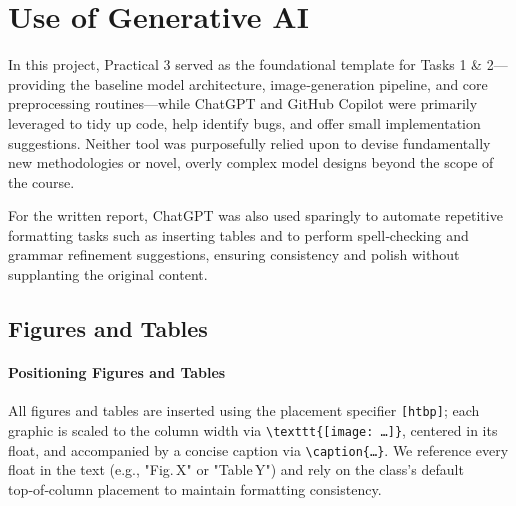 \documentclass[conference]{IEEEtran}
\begin{document}
\section{Use of Generative AI}

In this project, Practical 3 served as the foundational template for Tasks 1 \& 2—providing the baseline model architecture, image‐generation pipeline, and core preprocessing routines—while ChatGPT and GitHub Copilot were primarily leveraged to tidy up code, help identify bugs, and offer small implementation suggestions. Neither tool was purposefully relied upon to devise fundamentally new methodologies or novel, overly complex model designs beyond the scope of the course. 

For the written report, ChatGPT was also used sparingly to automate repetitive formatting tasks such as inserting tables and to perform spell‑checking and grammar refinement suggestions, ensuring consistency and polish without supplanting the original content.

\subsection{Figures and Tables}

\paragraph{Positioning Figures and Tables}

All figures and tables are inserted using the placement specifier \verb|[htbp]|; each graphic is scaled to the column width via
\verb|\texttt{[image: …]}|, centered in its float, and accompanied by a concise caption via \verb|\caption{…}|. We reference every float in the text (e.g., "Fig. X" or "Table Y") and rely on the class’s default top‑of‑column placement to maintain formatting consistency.
\end{document}
